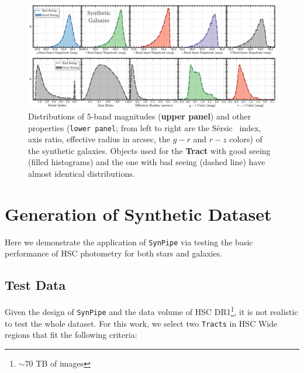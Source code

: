 \documentclass[useamsfonts]{pasj01}
\def\ser{{S\'{e}rsic\ }}
\def\synpipe{\texttt{SynPipe}}
\def\tracts{\texttt{Tracts}}
\begin{document}
\begin{figure}
    \begin{center}
        \includegraphics[width=\textwidth]{fig/synpipe_galaxy_sample}
    \end{center}
    \caption{
        Distributions of 5-band magnitudes (\textbf{upper panel}) and other properties
        (\texttt{lower panel}; from left to right are the \ser{} index, axis ratio,
        effective radius in arcsec, the $g-r$ and $r-z$ colors) of the synthetic
        galaxies.
        Objects used for the \textbf{Tract} with good seeing (filled histograms) and
        the one with bad seeing (dashed line) have almost identical distributions.
        }
    \label{fig:galaxy_sample}
\end{figure}

\section{Generation of Synthetic Dataset}
    \label{sec:test}

    Here we demonstrate the application of \synpipe{} via testing the basic performance
    of HSC photometry for both stars and galaxies.

\subsection{Test Data}

    Given the design of \synpipe{} and the data volume of HSC DR1\footnote{${\sim}70$
    TB of images}, it is not realistic to test the whole dataset.
    For this work, we select two \tracts{} in HSC Wide regions
    that fit the following criteria:
\end{document}
